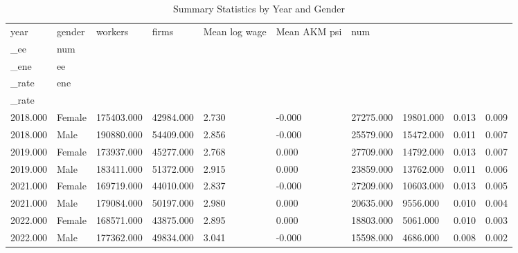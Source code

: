 \begin{table}[!htbp]\centering
\caption{Summary Statistics by Year and Gender}
\begin{tabular}{llllllllll}
\hline
year & gender & workers & firms & Mean log wage & Mean AKM psi & num\\_ee & num\\_ene & ee\\_rate & ene\\_rate
\\ \hline
2018.000 & Female & 175403.000 & 42984.000 & 2.730 & -0.000 & 27275.000 & 19801.000 & 0.013 & 0.009 \\
2018.000 & Male & 190880.000 & 54409.000 & 2.856 & -0.000 & 25579.000 & 15472.000 & 0.011 & 0.007 \\
2019.000 & Female & 173937.000 & 45277.000 & 2.768 & 0.000 & 27709.000 & 14792.000 & 0.013 & 0.007 \\
2019.000 & Male & 183411.000 & 51372.000 & 2.915 & 0.000 & 23859.000 & 13762.000 & 0.011 & 0.006 \\
2021.000 & Female & 169719.000 & 44010.000 & 2.837 & -0.000 & 27209.000 & 10603.000 & 0.013 & 0.005 \\
2021.000 & Male & 179084.000 & 50197.000 & 2.980 & 0.000 & 20635.000 & 9556.000 & 0.010 & 0.004 \\
2022.000 & Female & 168571.000 & 43875.000 & 2.895 & 0.000 & 18803.000 & 5061.000 & 0.010 & 0.003 \\
2022.000 & Male & 177362.000 & 49834.000 & 3.041 & -0.000 & 15598.000 & 4686.000 & 0.008 & 0.002 \\
\hline
\end{tabular}
\end{table}
